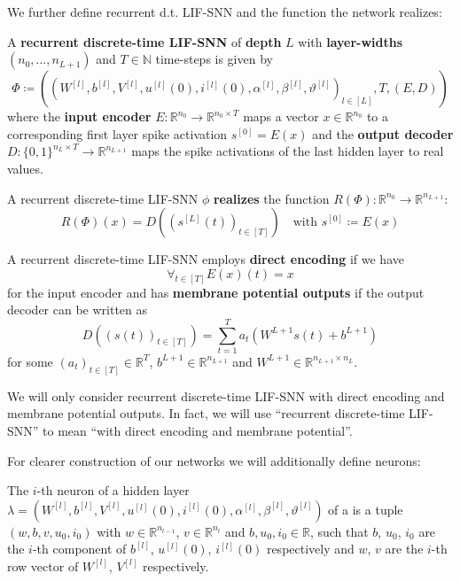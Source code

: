 We further define recurrent d.t. LIF-SNN and the function the network realizes:
\begin{definition}
  A \textbf{recurrent discrete-time LIF-SNN} of \textbf{depth} \(L\) with \textbf{layer-widths} \((n_0,…,n_{L+1})\) and \(T∈ℕ\) time-steps is given by
  \[ Φ≔((W^{[l]},b^{[l]},V^{[l]},u^{[l]}(0),i^{[l]}(0),α^{[l]},β^{[l]},ϑ^{[l]})_{l∈[L]},T,(E,D)) \]
  where the \textbf{input encoder} \(E:ℝ^{n_0}→ℝ^{n_0×T}\) maps a vector \(x∈ℝ^{n_0}\) to a corresponding first layer spike activation \(s^{[0]}=E(x)\) and the \textbf{output decoder} \(D:\{0,1\}^{n_L×T}→ℝ^{n_{L+1}}\) maps the spike activations of the last hidden layer to real values.
\end{definition}

\begin{definition}
  A recurrent discrete-time LIF-SNN \(ϕ\) \textbf{realizes} the function \(R(Φ):ℝ^{n_0}→ℝ^{n_{L+1}}\):
  \[ R(Φ)(x)=D((s^{[L]}(t))_{t∈[T]})\quad \text{with }s^{[0]}≔E(x)\]
\end{definition}

\begin{definition}
  A recurrent discrete-time LIF-SNN employs \textbf{direct encoding} if we have
  \[ ∀_{t∈[T]}E(x)(t)=x \]
  for the input encoder and has \textbf{membrane potential outputs} if the output decoder can be written as
  \[ D((s(t))_{t∈[T]})=\sum_{t=1}^Ta_t(W^{L+1}s(t)+b^{L+1}) \]
  for some \((a_t)_{t∈[T]}∈ℝ^T\), \(b^{L+1}∈ℝ^{n_{L+1}}\) and \(W^{L+1}∈ℝ^{n_{L+1}×n_L}\).
\end{definition}
We will only consider recurrent discrete-time LIF-SNN with direct encoding and membrane potential outputs. In fact, we will use “recurrent discrete-time LIF-SNN” to mean “\dtlifsnn with direct encoding and membrane potential”.

For clearer construction of our networks we will additionally define neurons:

\begin{definition}
  The \(i\)-th neuron of a hidden layer \(λ=(W^{[l]},b^{[l]},V^{[l]},u^{[l]}(0),i^{[l]}(0),α^{[l]},β^{[l]},ϑ^{[l]})\) of a \dtlifsnn is a tuple \((w,b,v,u_0,i_0)\) with \(w∈ℝ^{n_{l-1}}\), \(v∈ℝ^{n_l}\) and \(b,u_0,i_0∈ℝ\), such that \(b\), \(u_0\), \(i_0\) are the \(i\)-th component of \(b^{[l]}\), \(u^{[l]}(0)\), \(i^{[l]}(0)\) respectively and \(w\), \(v\) are the \(i\)-th row vector of \(W^{[l]}\), \(V^{[l]}\) respectively.
\end{definition}

